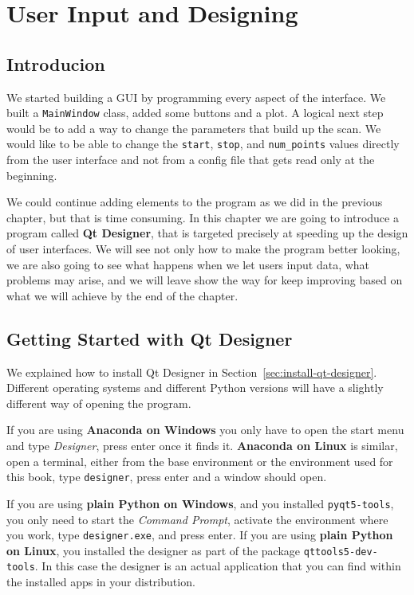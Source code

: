\chapter{User Input and Designing}\label{ch:user-input-designer}


\section{Introducion}\label{sec:user-input-introduction}
We started building a GUI by programming every aspect of the interface. We built a \texttt{MainWindow} class, added some buttons and a plot. A logical next step would be to add a way to change the parameters that build up the scan. We would like to be able to change the \texttt{start}, \texttt{stop}, and \texttt{num\_points} values directly from the user interface and not from a config file that gets read only at the beginning.

We could continue adding elements to the program as we did in the previous chapter, but that is time consuming. In this chapter we are going to introduce a program called \textbf{Qt Designer}, that is targeted precisely at speeding up the design of user interfaces. We will see not only how to make the program better looking, we are also going to see what happens when we let users input data, what problems may arise, and we will leave show the way for keep improving based on what we will achieve by the end of the chapter.

\section{Getting Started with Qt Designer}\label{sec:getting-started-with-qt-designer}
We explained how to install Qt Designer in Section~\ref{sec:install-qt-designer}. Different operating systems and different Python versions will have a slightly different way of opening the program.

If you are using \textbf{Anaconda on Windows} you only have to open the start menu and type \textit{Designer}, press \texttt{}enter once it finds it. \textbf{Anaconda on Linux} is similar, open a terminal, either from the base environment or the environment used for this book, type \texttt{designer}, press enter and a window should open.

If you are using \textbf{plain Python on Windows}, and you installed \texttt{pyqt5-tools}, you only need to start the \emph{Command Prompt}, activate the environment where you work, type \texttt{designer.exe}, and press enter. If you are using \textbf{plain Python on Linux}, you installed the designer as part of the package \texttt{qttools5-dev-tools}. In this case the designer is an actual application that you can find within the installed apps in your distribution.

